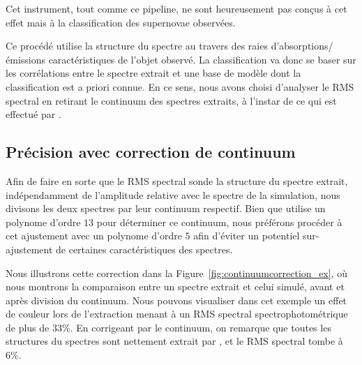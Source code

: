 \documentclass[../main/main.tex]{subfiles}
\begin{document}
Cet instrument, tout comme ce pipeline, ne sont heureusement pas conçus à
cet effet mais à la classification des supernovae observées.

Ce procédé utilise la structure du spectre au travers des raies
d'absorptions/émissions caractéristiques de l'objet observé. La
classification va donc se baser sur les corrélations entre le spectre
extrait et une base de modèle dont la classification est a priori
connue. En ce sens, nous avons choisi d'analyser le RMS spectral en
retirant le continuum des spectres extraits, à l'instar de ce qui est
effectué par  \citep{BlondinSNID}.

\clearpage
\subsection{Précision avec correction de continuum}

Afin de faire en sorte que le RMS spectral sonde la structure du spectre
extrait, indépendamment de l'amplitude relative avec le spectre de la
simulation, nous divisons les deux spectres par leur continuum
respectif. Bien que  utilise un polynome 
d'ordre $13$ pour déterminer ce continuum, nous préférons procéder à
cet ajustement avec un polynome
d'ordre $5$ afin d'éviter un potentiel sur-ajustement de certaines
caractéristiques des spectres.

Nous illustrons cette correction dans la
Figure~\ref{fig:continuumcorrection_ex}, où nous montrons la comparaison
entre un spectre extrait et celui simulé, avant et après division du
continuum. Nous pouvons visualiser dans cet exemple un effet de couleur
lors de l'extraction menant à un RMS spectral spectrophotométrique de
plus de $33\%$. En corrigeant par le continuum, on remarque que toutes
les structures du spectres sont nettement extrait par \hypergal, et
le RMS spectral tombe à $6\%$.
\end{document}
